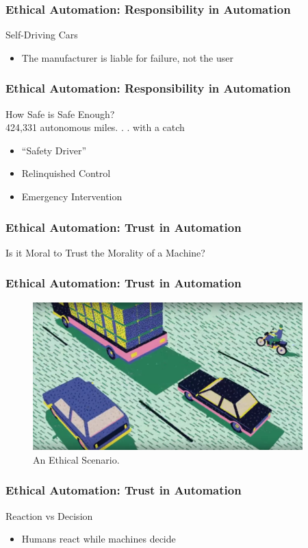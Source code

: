 \begin{frame}
  \frametitle{ Ethical Automation: Responsibility in Automation}
  {\Large Self-Driving Cars}
  \begin{itemize}
  \item The manufacturer is liable for failure, not the user
  \end{itemize}
\end{frame}


\begin{frame}
  \frametitle{ Ethical Automation: Responsibility in Automation}
  {\Large How Safe is Safe Enough?}\\
  424,331 autonomous miles. . . with a catch
  \begin{itemize}
  \item ``Safety Driver''
  \item Relinquished Control
  \item Emergency Intervention
  \end{itemize}
\end{frame}


\begin{frame}
  \frametitle{ Ethical Automation: Trust in Automation}
  \Large{Is it Moral to Trust the Morality of a Machine?}
\end{frame}


\begin{frame}
  \frametitle{ Ethical Automation: Trust in Automation}
  \begin{figure}[bht]
    \centering
    \includegraphics[width=4.1in]{diagrams/image00}
    \caption{An Ethical Scenario.}
    \label{fig:-deg}
  \end{figure}
\end{frame}


\begin{frame}
  \frametitle{ Ethical Automation: Trust in Automation}
  {\Large Reaction vs Decision}
  \begin{itemize}
  \item Humans react while machines decide
  \end{itemize}
\end{frame}


